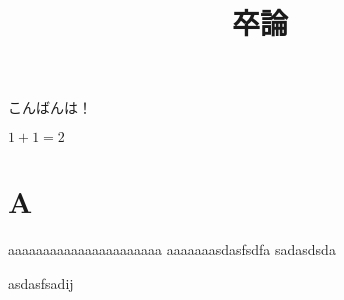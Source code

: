 \documentclass{jsarticle}
\title{卒論}
\theoremstyle{definition}
\begin{document}
\maketitle
こんばんは！

$1 + 1 = 2$


\section{A}

aaaaaaaaaaaaaaaaaaaaaa
aaaaaaasdasfsdfa sadasdsda

asdasfsadij
\end{document}
